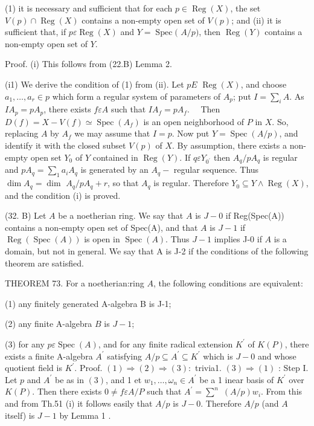 (1) it is necessary and sufficient that for each $p \in \operatorname{Reg}(X)$, the set $V(p) \cap \operatorname{Reg}(X)$ contains a non-empty open set of $V(p)$; and (ii) it is sufficient that, if $p \varepsilon \operatorname{Reg}(X)$ and $Y=\operatorname{Spec}($ $A / p)$, then $\operatorname{Reg}(Y)$ contains a non-empty open set of $Y$.

Proof. (i) This follows from (22.B) Lemma 2.

(i1) We derive the condition of (1) from (ii). Let $p E$ $\operatorname{Reg}(X)$, and choose $a_{1}, \ldots, a_{r} \in p$ which form a regular system of parameters of $A_{p}$; put $I=\sum_{i} A$. As $I A_{p}=p A_{p}$, there exists $f \varepsilon A$ such that $I A_{f}=p A_{f} . \quad$ Then $D(f)=X-V(f) \simeq \operatorname{Spec}\left(A_{f}\right)$ is an open neighborhood of $P$ in $X$. So, replacing $A$ by $A_{f}$ we may assume that $I=p$. Now put $Y=\operatorname{Spec}(A / p)$, and identify it with the closed subset $V(p)$ of $X$. By assumption, there exists a non-empty open set $Y_{0}$ of $Y$ contained in $\operatorname{Reg}(Y)$. If $q \varepsilon Y_{0^{\prime}}$ then $A_{q} / p A_{q}$ is regular and $p A_{q}=\sum_{1} a_{i} A_{q}$ is generated by an $A_{q}-$ regular sequence. Thus $\operatorname{dim} A_{q}=\operatorname{dim~} A_{q} / p A_{q}+r$, so that $A_{q}$ is regular. Therefore $Y_{0} \subseteq Y \wedge \operatorname{Reg}(X)$, and the condition (i) is proved.

(32. B) Let $A$ be a noetherian ring. We say that $A$ is $J-0$ if Reg(Spec(A)) contains a non-empty open set of Spec(A), and that $A$ is $J-1$ if $\operatorname{Reg}(\operatorname{Spec}(A))$ is open in $\operatorname{Spec}(A) .$ Thus $J-1$ implies J-0 if $A$ is a domain, but not in general. We say that A is J-2 if the conditions of the following theorem are satisfied.

THEOREM 73. For a noetherian:ring $A$, the following conditions are equivalent:

(1) any finitely generated A-algebra B is J-1;

(2) any finite A-algebra $B$ is $J-1$;

(3) for any $p \varepsilon \operatorname{Spec}(A)$, and for any finite radical extension $K^{\prime}$ of $K(P)$, there exists a finite A-algebra $A^{\prime}$ satisfying $A / p \subseteq A^{\prime} \subseteq K^{\prime}$ which is $J-0$ and whose quotient field is $K^{\prime}$. Proof. $(1) \Rightarrow(2) \Rightarrow(3):$ trivia1. $(3) \Rightarrow(1)$ : Step I. Let $p$ and $A^{\prime}$ be as in $(3)$, and 1 et $w_{1}, \ldots, \omega_{n} \in A^{\prime}$ be a 1 inear basis of $K^{\prime}$ over $K(P)$. Then there exists $0 \neq f \varepsilon A / P$ such that $A^{\prime}=\sum^{n}$ $(A / p) w_{i}$. From this and from Th.51 (i) it follows easily that $A / p$ is $J-0$. Therefore $A / p$ (and $A$ itself) is $J-1$ by Lemma 1 .

